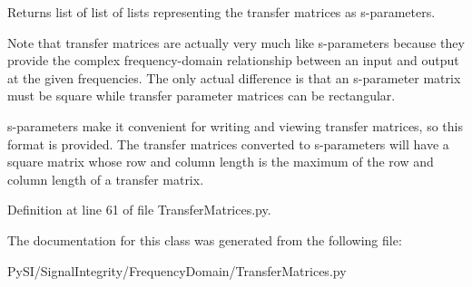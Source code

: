 \begin{DoxyReturn}{Returns}
list of list of lists representing the transfer matrices as s-\/parameters. 
\end{DoxyReturn}
\begin{DoxyNote}{Note}
that transfer matrices are actually very much like s-\/parameters because they provide the complex frequency-\/domain relationship between an input and output at the given frequencies. The only actual difference is that an s-\/parameter matrix must be square while transfer parameter matrices can be rectangular.
\end{DoxyNote}
s-\/parameters make it convenient for writing and viewing transfer matrices, so this format is provided. The transfer matrices converted to s-\/parameters will have a square matrix whose row and column length is the maximum of the row and column length of a transfer matrix. 

Definition at line 61 of file Transfer\+Matrices.\+py.



The documentation for this class was generated from the following file\+:\begin{DoxyCompactItemize}
\item 
Py\+S\+I/\+Signal\+Integrity/\+Frequency\+Domain/Transfer\+Matrices.\+py\end{DoxyCompactItemize}
